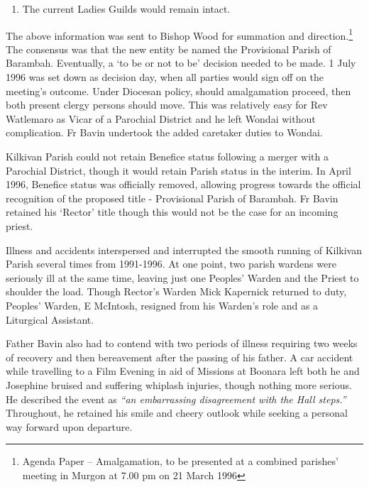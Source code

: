 \begin{enumerate}

\def\labelenumi{\arabic{enumi}.}

\setcounter{enumi}{5}

\item

  The current Ladies Guilds would remain intact.

\end{enumerate}



\smallskip


The above information was sent to Bishop Wood for summation and direction.\footnote{Agenda Paper -- Amalgamation, to be presented at a combined parishes' meeting in Murgon at 7.00 pm on 21 March 1996} The consensus was that the new entity be named the Provisional Parish of Barambah. Eventually, a `to be or not to be' decision needed to be made. 1 July 1996 was set down as decision day, when all parties would sign off on the meeting's outcome. Under Diocesan policy, should amalgamation proceed, then both present clergy persons should move. This was relatively easy for Rev Watlemaro as Vicar of a Parochial District and he left Wondai without complication. Fr Bavin undertook the added caretaker duties to Wondai.


Kilkivan Parish could not retain Benefice status following a merger with a Parochial District, though it would retain Parish status in the interim. In April 1996, Benefice status was officially removed, allowing progress towards the official recognition of the proposed title - Provisional Parish of Barambah. Fr Bavin retained his `Rector' title though this would not be the case for an incoming priest.



Illness and accidents interspersed and interrupted the smooth running of Kilkivan Parish several times from 1991-1996. At one point, two parish wardens were seriously ill at the same time, leaving just one Peoples' Warden and the Priest to shoulder the load. Though Rector's Warden Mick Kapernick returned to duty, Peoples' Warden, E McIntosh, resigned from his Warden's role and as a Liturgical Assistant.



Father Bavin also had to contend with two periods of illness requiring two weeks of recovery and then bereavement after the passing of his father. A car accident while travelling to a Film Evening in aid of Missions at Boonara left both he and Josephine bruised and suffering whiplash injuries, though nothing more serious. He described the event as \emph{``an embarrassing disagreement with the Hall steps.''} Throughout, he retained his smile and cheery outlook while seeking a personal way forward upon departure.




